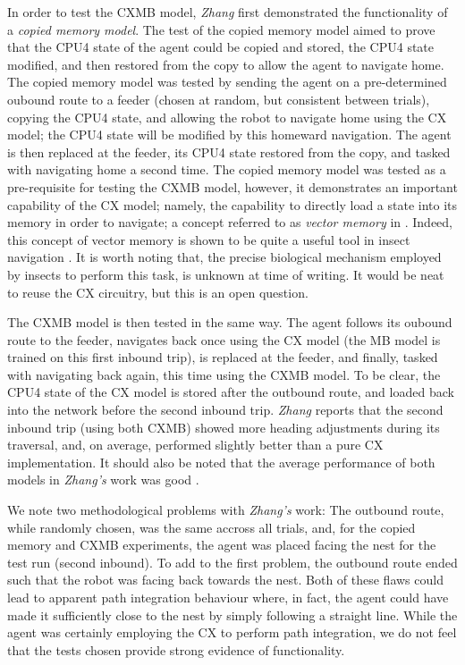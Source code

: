 \documentclass[a4paper,11pt,twoside,openright]{article}
\begin{document}
In order to test the CXMB model, \textit{Zhang} first demonstrated the
functionality of a \textit{copied memory model}. The test of the copied memory
model aimed to prove that the CPU4 state of the agent could be copied and stored,
the CPU4 state modified, and then restored from the copy to allow the agent to
navigate home. The copied memory model was tested by sending the agent on a
pre-determined oubound route to a feeder (chosen at random, but consistent
between trials), copying the CPU4 state, and allowing the robot to navigate home
using the CX model; the CPU4 state will be modified by this homeward navigation.
The agent is then replaced at the feeder, its CPU4 state restored from the copy,
and tasked with navigating home a second time. The copied memory model was tested
as a pre-requisite for testing the CXMB model, however, it demonstrates an
important capability of the CX model; namely, the capability to directly load a
state into its memory in order to navigate; a concept referred to as
\textit{vector memory} in \cite{Webb2019}. Indeed, this concept of vector memory
is shown to be quite a useful tool in insect navigation \cite{Webb2019}. It is
worth noting that, the precise biological mechanism employed by insects to
perform this task, is unknown at time of writing. It would be neat to reuse
the CX circuitry, but this is an open question.
\newline
\par

The CXMB model is then tested in the same way. The agent follows its oubound
route to the feeder, navigates back once using the CX model (the MB model is
trained on this first inbound trip), is replaced at the
feeder, and finally, tasked with navigating back again, this time using the CXMB
model. To be clear, the CPU4 state of the CX model is stored after the outbound
route, and loaded back into the network before the second inbound trip.
\textit{Zhang} reports that the second inbound trip (using both CXMB) showed
more heading adjustments during its traversal, and, on average, performed
slightly better than a pure CX implementation\cite{Zhang2017}. It should also
be noted that the average performance of both models in \textit{Zhang's} work
was good \cite{Zhang2017}.
\newline
\par

We note two methodological problems with \textit{Zhang's} work: The outbound
route, while randomly chosen, was the same accross all trials, and, for the
copied memory and CXMB experiments, the agent was placed facing the nest for
the test run (second inbound). To add to the first problem, the outbound route
ended such that the robot was facing back towards the nest. Both of these flaws
could lead to apparent path integration behaviour where, in fact, the agent
could have made it sufficiently close to the nest by simply following a straight
line. While the agent was certainly employing the CX to perform path integration,
we do not feel that the tests chosen provide strong evidence of functionality.
\end{document}
